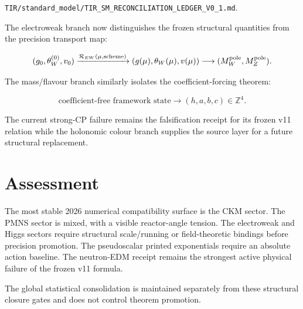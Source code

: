 \texttt{TIR/standard\_model/TIR\_SM\_RECONCILIATION\_LEDGER\_V0\_1.md}.

The electroweak branch now distinguishes the frozen structural quantities from
the precision transport map:

\[
(g_0,\theta_W^{(0)},v_0)
\xrightarrow{\mathcal R_{EW}(\mu,\mathrm{scheme})}
(g(\mu),\theta_W(\mu),v(\mu))
\longrightarrow
(M_W^{\rm pole},M_Z^{\rm pole}).
\]

The mass/flavour branch similarly isolates the coefficient-forcing theorem:

\[
\text{coefficient-free framework state}
\longrightarrow
(h,a,b,c)\in\mathbb Z^4.
\]

The current strong-CP failure remains the falsification receipt for its frozen
v11 relation while the holonomic colour branch supplies the source layer for a
future structural replacement.

\section{Assessment}
The most stable 2026 numerical compatibility surface is the CKM sector.  The
PMNS sector is mixed, with a visible reactor-angle tension.  The electroweak and
Higgs sectors require structural scale/running or field-theoretic bindings before
precision promotion.  The pseudoscalar printed exponentials require an absolute
action baseline.  The neutron-EDM receipt remains the strongest active physical
failure of the frozen v11 formula.

The global statistical consolidation is maintained separately from these
structural closure gates and does not control theorem promotion.
